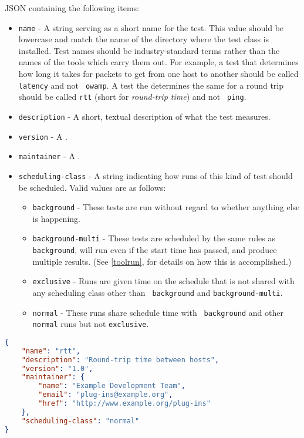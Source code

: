 \documentclass[10pt,titlepage]{article}
\begin{document}
 JSON containing the following items:
\begin{itemize}
\item{\tt name} - A string serving as a short name for the test.  This
  value should be lowercase and match the name of the directory where
  the test class is installed.  Test names should be industry-standard
  terms rather than the names of the tools which carry them out.  For
  example, a test that determines how long it takes for packets to get
  from one host to another should be called {\tt latency} and not {\tt
    owamp}.  A test the determines the same for a round trip should be
  called {\tt rtt} (short for {\it round-trip time}) and not {\tt
    ping}.
\item{\tt description} - A short, textual description of what the test
  measures.
\item{\tt version} - A .
\item{\tt maintainer} - A .
\item{\tt scheduling-class} - A string indicating how runs of this
  kind of test should be scheduled.  Valid values are as follows:
  \begin{itemize}
  \item {\tt background} - These tests are run without regard to
    whether anything else is happening.
  \item {\tt background-multi} - These tests are scheduled by the same
    rules as {\tt background}, will run even if the start time has
    passed, and produce multiple results.  (See \autoref{toolrun},
    {\it {}} for details on how this is accomplished.)
  \item {\tt exclusive} - Runs are given time on the schedule
    that is not shared with any scheduling class other than {\tt
      background} and {\tt background-multi}.
  \item {\tt normal} - These runs share schedule time with {\tt
    background} and other {\tt normal} runs but not {\tt exclusive}.
  \end{itemize}
\end{itemize}

\example
\begin{lstlisting}[language=json,firstnumber=1]
{
    "name": "rtt",
    "description": "Round-trip time between hosts",
    "version": "1.0",
    "maintainer": {
        "name": "Example Development Team",
        "email": "plug-ins@example.org",
        "href": "http://www.example.org/plug-ins"
    },
    "scheduling-class": "normal"
}
\end{lstlisting}
\end{document}
